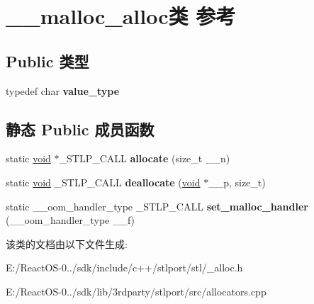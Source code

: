 \hypertarget{class____malloc__alloc}{}\section{\+\_\+\+\_\+malloc\+\_\+alloc类 参考}
\label{class____malloc__alloc}
\subsection*{Public 类型}
\begin{DoxyCompactItemize}
\item 
\mbox{\label{class____malloc__alloc_ad443dde5e5ccc1161ab71da71bcb58ae}} 
typedef char {\bfseries value\+\_\+type}
\end{DoxyCompactItemize}
\subsection*{静态 Public 成员函数}
\begin{DoxyCompactItemize}
\item 
\mbox{\label{class____malloc__alloc_ad31a8f7deb01f3a41c6bb961341e0ee8}} 
static \hyperlink{interfacevoid}{void} $\ast$\+\_\+\+S\+T\+L\+P\+\_\+\+C\+A\+LL {\bfseries allocate} (size\+\_\+t \+\_\+\+\_\+n)
\item 
\mbox{\label{class____malloc__alloc_a7f68928afe0ebe9ac1079914f397d665}} 
static \hyperlink{interfacevoid}{void} \+\_\+\+S\+T\+L\+P\+\_\+\+C\+A\+LL {\bfseries deallocate} (\hyperlink{interfacevoid}{void} $\ast$\+\_\+\+\_\+p, size\+\_\+t)
\item 
\mbox{\label{class____malloc__alloc_a0a0162b4dd840347b472e393b142422a}} 
static \+\_\+\+\_\+oom\+\_\+handler\+\_\+type \+\_\+\+S\+T\+L\+P\+\_\+\+C\+A\+LL {\bfseries set\+\_\+malloc\+\_\+handler} (\+\_\+\+\_\+oom\+\_\+handler\+\_\+type \+\_\+\+\_\+f)
\end{DoxyCompactItemize}


该类的文档由以下文件生成\+:\begin{DoxyCompactItemize}
\item 
E\+:/\+React\+O\+S-\/0../sdk/include/c++/stlport/stl/\+\_\+alloc.\+h\item 
E\+:/\+React\+O\+S-\/0../sdk/lib/3rdparty/stlport/src/allocators.\+cpp\end{DoxyCompactItemize}
